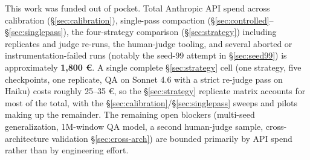 This work was funded out of pocket. Total Anthropic API spend across
calibration (\S\ref{sec:calibration}), single-pass compaction (\S\ref{sec:controlled}--\S\ref{sec:singlepass}), the four-strategy
comparison (\S\ref{sec:strategy}) including replicates and judge re-runs, the human-judge
tooling, and several aborted or instrumentation-failed runs (notably
the seed-99 attempt in \S\ref{sec:seed99}) is approximately \textbf{1{,}800 \euro}. A single
complete \S\ref{sec:strategy} cell (one strategy, five checkpoints, one replicate, QA on
Sonnet 4.6 with a strict re-judge pass on Haiku) costs roughly 25--35 \euro,
so the \S\ref{sec:strategy} replicate matrix accounts for most of the total, with the
\S\ref{sec:calibration}/\S\ref{sec:singlepass} sweeps and pilots making up the remainder. The remaining open
blockers (multi-seed generalization, 1M-window QA model, a second
human-judge sample, cross-architecture validation \S\ref{sec:cross-arch}) are bounded
primarily by API spend rather than by engineering effort.
